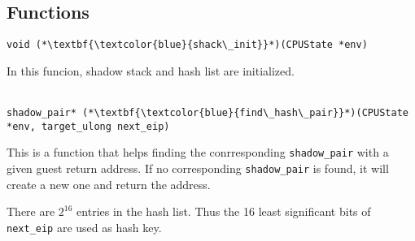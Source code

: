 \documentclass[12pt]{article}
\begin{document}
    \newpage

    \subsection{Functions}
        \begin{lstlisting}[style=Function]
            void (*\textbf{\textcolor{blue}{shack\_init}}*)(CPUState *env)
        \end{lstlisting}
        In this funcion, shadow stack and hash list are initialized.
        \\\\
        \begin{lstlisting}[style=Function] 
            shadow_pair* (*\textbf{\textcolor{blue}{find\_hash\_pair}}*)(CPUState *env, target_ulong next_eip)
        \end{lstlisting}
        This is a function that helps finding the conrresponding \verb|shadow_pair| with a given guest return address.
        If no corresponding \verb|shadow_pair| is found, it will create a new one and return the address.

        There are $2^{16}$ entries in the hash list.
        Thus the 16 least significant bits of \verb|next_eip| are used as hash key.
\end{document}
